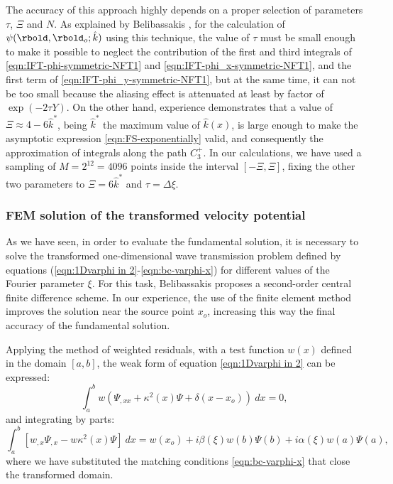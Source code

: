 The accuracy of this approach highly depends on a proper selection of parameters $\tau$, $\Xi$ and $N$. As explained by Belibassakis \cite{Belibassakis2000}, for the calculation of $\psi(\rbold,\rbold_{o}; \hat{k})$ using this technique, the value of $\tau$ must be small enough to make it possible to neglect the contribution of the first and third integrals of \eqref{eqn:IFT-phi-symmetric-NFT1} and \eqref{eqn:IFT-phi_x-symmetric-NFT1}, and the first term of \eqref{eqn:IFT-phi_y-symmetric-NFT1}, but at the same time, it can not be too small because the aliasing effect is attenuated at least by factor of $\exp(-2\tau Y)$. On the other hand, experience demonstrates that a value of $\Xi \approx 4-6\hat k^{*}$, being $\hat k^{*}$ the maximum value of $\hat k(x)$, is large enough to make the asymptotic expression \eqref{eqn:FS-exponentially} valid, and consequently the approximation of integrals along the path $C_{3}^{+}$. In our calculations, we have used a sampling of $M=2^{12}=4096$ points inside the interval $[-\Xi,\Xi]$, fixing the other two parameters to $\Xi=6\hat k^{*}$ and $\tau=\Delta \xi$.

\subsubsection{FEM solution of the transformed velocity potential}
As we have seen, in order to evaluate the fundamental solution, it is necessary to solve the transformed one-dimensional wave transmission problem defined by equations (\ref{eqn:1Dvarphi in 2}-\ref{eqn:bc-varphi-x}) for different values of the Fourier parameter $\xi$. For this task, Belibassakis \cite{Belibassakis2000} proposes a second-order central finite difference scheme. In our experience, the use of the finite element method improves the solution near the source point $x_{o}$, increasing this way the final accuracy of the fundamental solution.

Applying the method of weighted residuals, with a test function $w(x)$ defined in the domain $[a,b]$, the weak form of equation \eqref{eqn:1Dvarphi in 2} can be expressed:
%
\begin{equation}
\label{eqn:FEM1Dweakform1}
\int_{a}^{b} w( \varPsi_{,xx} + \kappa^{2}(x)\varPsi +  \delta(x-x_o)) \: dx = 0,
\end{equation}
%
and integrating by parts:
%
\begin{equation}
\label{eqn:FEM1Dweakform3}
\int_{a}^{b}[w_{,x} \varPsi_{,x}-w\kappa^{2}(x)\varPsi] \: dx = 
w(x_o) + i\beta(\xi) w(b) \varPsi(b) + i\alpha(\xi) w(a) \varPsi(a),
\end{equation}
%
where we have substituted the matching conditions \eqref{eqn:bc-varphi-x} that close the transformed domain.

